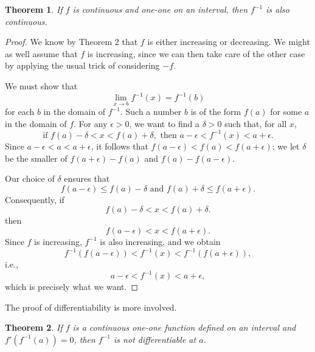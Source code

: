 \documentclass{article}
\numberwithin{corollary}{subsection}
\numberwithin{definition}{subsection}
\numberwithin{lemma}{subsection}
\newtheorem{theorem}{Theorem}
\numberwithin{theorem}{subsection}
\begin{document}
\begin{theorem}
  If $f$ is continuous and one-one on an interval, then $f^{-1}$ is also
  continuous.
\end{theorem}
\begin{proof}
  We know by Theorem 2 that $f$ is either increasing or decreasing. We might as
  well assume that $f$ is increasing, since we can then take care of the other
  case by applying the usual trick of considering $-f$.

  We must show that \[
    \lim_{x \to b} f^{-1}(x) = f^{-1}(b)
  \] for each $b$ in the domain of $f^{-1}$. Such a number $b$ is of the form
  $f(a)$ for some $a$ in the domain of $f$. For any $\epsilon > 0$, we want to
  find a $\delta > 0$ such that, for all $x$, \[
    \text{if } f(a) - \delta < x < f(a) + \delta,
    \text{ then } a - \epsilon < f^{-1}(x) < a + \epsilon.
  \] Since $a - \epsilon < a < a + \epsilon$, it follows that $f(a - \epsilon)
  < f(a) < f(a + \epsilon)$; we let $\delta$ be the smaller of $f(a + \epsilon)
  - f(a)$ and $f(a) - f(a - \epsilon)$.

  Our choice of $\delta$ ensures that \[
    f(a - \epsilon)
    \leq f(a) - \delta \text{ and } f(a) + \delta \leq f(a + \epsilon).
  \] Consequently, if \[
    f(a) - \delta < x < f(a) + \delta.
  \] then \[
    f(a - \epsilon) < x < f(a + \epsilon).
    \] Since $f$ is increasing, $f^{-1}$ is also increasing, and we obtain \[
    f^{-1}(f(a - \epsilon)) < f^{-1}(x) < f^{-1}(f(a + \epsilon)),
  \] i.e., \[
    a - \epsilon < f^{-1}(x) < a + \epsilon,
  \] which is precisely what we want.
\end{proof}

The proof of differentiability is more involved.

\begin{theorem}
  If $f$ is a continuous one-one function defined on an interval and
  $f'(f^{-1}(a)) = 0$, then $f^{-1}$ is \emph{not} differentiable at $a$.
\end{theorem}
\end{document}
